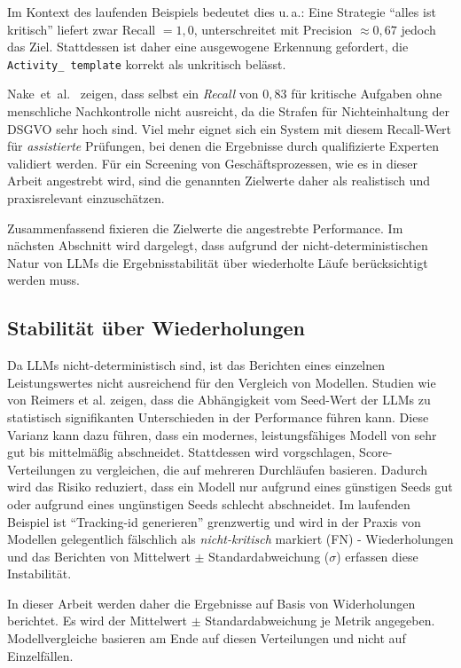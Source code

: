 Im Kontext des laufenden Beispiels bedeutet dies u.\,a.: Eine Strategie \enquote{alles ist kritisch} liefert zwar Recall $=1{,}0$, unterschreitet mit Precision $\approx 0{,}67$ jedoch das Ziel. Stattdessen ist daher eine ausgewogene Erkennung gefordert, die \texttt{Activity\_\linebreak~template} korrekt als unkritisch belässt.

Nake~et~al.\ \cite{nake2023towards} zeigen, dass selbst ein \emph{Recall} von $0{,}83$ für kritische Aufgaben ohne menschliche Nachkontrolle nicht ausreicht, da die Strafen für Nichteinhaltung der \ac{DSGVO} sehr hoch sind. Viel mehr eignet sich ein System mit diesem Recall-Wert für \emph{assistierte} Prüfungen, bei denen die Ergebnisse durch qualifizierte Experten validiert werden. Für ein Screening von Geschäftsprozessen, wie es in dieser Arbeit angestrebt wird, sind die genannten Zielwerte daher als realistisch und praxisrelevant einzuschätzen.

Zusammenfassend fixieren die Zielwerte die angestrebte Performance. Im nächsten Abschnitt wird dargelegt, dass aufgrund der nicht-deterministischen Natur von \acp{LLM} die Ergebnisstabilität über wiederholte Läufe berücksichtigt werden muss.

\subsection*{Stabilität über Wiederholungen}

Da \acp{LLM} nicht-deterministisch sind, ist das Berichten eines einzelnen Leistungswertes nicht ausreichend für den Vergleich von Modellen. Studien wie von Reimers et al. \cite{reimers2017reporting} zeigen, dass die Abhängigkeit vom Seed-Wert der \acp{LLM} zu statistisch signifikanten Unterschieden in der Performance führen kann. Diese Varianz kann dazu führen, dass ein modernes, leistungsfähiges Modell von sehr gut bis mittelmäßig abschneidet. Stattdessen wird vorgschlagen, Score-Verteilungen zu vergleichen, die auf mehreren Durchläufen basieren. Dadurch wird das Risiko reduziert, dass ein Modell nur aufgrund eines günstigen Seeds gut oder aufgrund eines ungünstigen Seeds schlecht abschneidet. Im laufenden Beispiel ist \enquote{Tracking-id generieren} grenzwertig und wird in der Praxis von Modellen gelegentlich fälschlich als \emph{nicht-kritisch} markiert (\ac{FN}) - Wiederholungen und das Berichten von Mittelwert $\pm$ Standardabweichung ($\sigma$) erfassen diese Instabilität.

In dieser Arbeit werden daher die Ergebnisse auf Basis von Widerholungen berichtet. Es wird der Mittelwert $\pm$ Standardabweichung je Metrik angegeben. Modellvergleiche basieren am Ende auf diesen Verteilungen und nicht auf Einzelfällen.